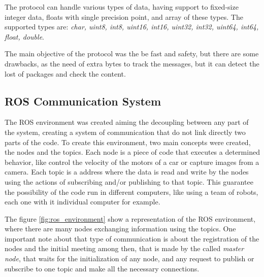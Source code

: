 The protocol can handle various types of data, having support to fixed-size integer data, floats with single precision point, and array of these types.
The supported types are: \emph{char, uint8, int8, uint16, int16, uint32, int32, uint64, int64, float, double}.

The main objective of the protocol was the be fast and safety, but there are some drawbacks, as the need of extra bytes to track the messages, but it can detect the lost of packages and check the content.


\subsection{ROS Communication System} %
\label{sub:ros_communication_system}

The ROS environment was created aiming the decoupling between any part of the system, creating a system of communication that do not link directly two parts of the code.
To create this environment, two main concepts were created, the nodes and the topics.
Each node is a piece of code that executes a determined behavior, like control the velocity of the motors of a car or capture images from a camera.
Each topic is a address where the data is read and write by the nodes using the actions of subscribing and/or publishing to that topic.
This guarantee the possibility of the code run in different computers, like using a team of robots, each one with it individual computer for example.

The figure \ref{fig:ros_environment} show a representation of the ROS environment, where there are many nodes exchanging information using the topics. One important note about that type of communication is about the registration of the nodes and the initial meeting among then, that is made by the called \emph{master node}, that waits for the initialization of any node, and any request to publish or subscribe to one topic and make all the necessary connections.

